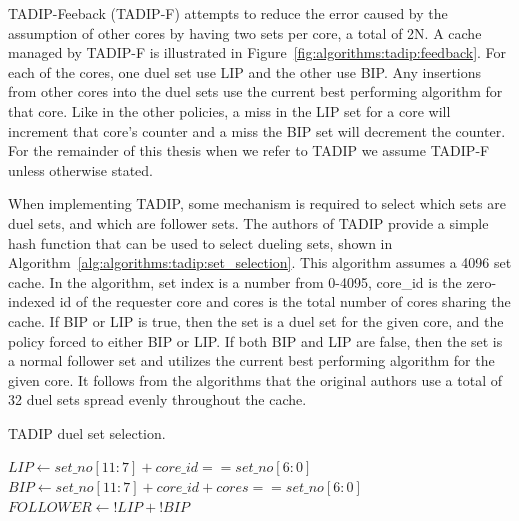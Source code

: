 TADIP-Feeback (TADIP-F) attempts to reduce the error caused by the assumption of other cores by having two sets per core, a total of 2N.
A cache managed by TADIP-F is illustrated in Figure~\ref{fig:algorithms:tadip:feedback}.
For each of the cores, one duel set use LIP and the other use BIP. 
Any insertions from other cores into the duel sets use the current best performing algorithm for that core.
Like in the other policies, a miss in the LIP set for a core will increment that core's counter and a miss the BIP set will decrement the counter.
For the remainder of this thesis when we refer to TADIP we assume TADIP-F unless otherwise stated.

When implementing TADIP, some mechanism is required to select which sets are duel sets, and which are follower sets.
The authors of TADIP provide a simple hash function that can be used to select dueling sets, shown in Algorithm~\ref{alg:algorithms:tadip:set_selection}.
This algorithm assumes a 4096 set cache.
In the algorithm, set index is a number from 0-4095, core\_id is the zero-indexed id of the requester core and cores is the total number of cores sharing the cache.
If BIP or LIP is true, then the set is a duel set for the given core, and the policy forced to either BIP or LIP.
If both BIP and LIP are false, then the set is a normal follower set and utilizes the current best performing algorithm for the given core.
It follows from the algorithms that the original authors use a total of 32 duel sets spread evenly throughout the cache.

\begin{algorithm}[ht]
\caption{TADIP duel set selection.}
\label{alg:algorithms:tadip:set_selection}
\begin{algorithmic}[1]
\State $LIP\gets set\_no[11:7] + core\_id == set\_no[6:0]$
\State $BIP\gets set\_no[11:7] + core\_id + cores == set\_no[6:0]$
\State $FOLLOWER\gets !LIP + !BIP$
\end{algorithmic}
\end{algorithm}
